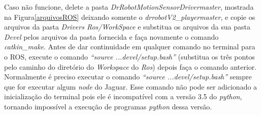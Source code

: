 Caso não funcione, delete a pasta \textit{DrRobotMotionSensorDriver\-master}, mostrada na Figura\ref{arquivosROS} deixando somente o \textit{drrobotV2\_player\-master}, e copie os arquivos da pasta \textit{Drivers Ros/WorkSpace} e substitua os arquivos da sua pasta \textit{Devel} pelos arquivos da pasta fornecida e faça novamente o comando \textit{catkin\_make}. Antes de dar continuidade em qualquer comando no terminal para o ROS, execute o comando \textit{“source ...devel/setup.bash”} (substitua os três pontos pelo caminho do diretório do \textit{Workspace} do \textit{Ros}) depois faça o comando anterior. Normalmente é preciso executar o comando \textit{“source ...devel/setup.bash”} sempre que for executar algum \textit{node} do Jaguar. Esse comando não pode ser adicionado a inicialização do terminal pois ele é incompatível com a versão 3.5 do \textit{python}, tornando impossível a execução de programas \textit{python} dessa versão.

	\begin{figure}[H]
		\centering
	\end{figure}
	
